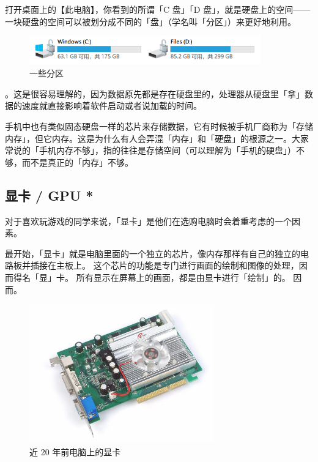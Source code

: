 打开桌面上的【此电脑】，你看到的所谓「C 盘」「D 盘」，就是硬盘上的空间——一块硬盘的空间可以被划分成不同的「盘」（学名叫「分区」）来更好地利用。

\begin{figure}[H]
  \centering
  \includegraphics[width=10cm]{assets/Partition.png}
  \caption{一些分区}
  \label{partitions}
\end{figure}


。这是很容易理解的，因为数据原先都是存在硬盘里的，处理器从硬盘里「拿」数据的速度就直接影响着软件启动或者说加载的时间。

\begin{note}
  手机中也有类似固态硬盘一样的芯片来存储数据，它有时候被手机厂商称为「存储内存」，但它内存。这是为什么有人会弄混「内存」和「硬盘」的根源之一。大家常说的「手机内存不够」，指的往往是存储空间（可以理解为「手机的硬盘」）不够，而不是真正的「内存」不够。
\end{note}

\subsection{显卡 / GPU *}

对于喜欢玩游戏的同学来说，「显卡」是他们在选购电脑时会着重考虑的一个因素。

最开始，「显卡」就是电脑里面的一个独立的芯片，像内存那样有自己的独立的电路板并插接在主板上。
这个芯片的功能是专门进行画面的绘制和图像的处理，因而得名「显」卡。
所有显示在屏幕上的画面，都是由显卡进行「绘制」的。
因而。

\begin{figure}[H]
  \centering
  \includegraphics[width=8cm]{assets/Old_GPU.jpg}
  \caption{近 20 年前电脑上的显卡}
  \label{old-gpu}
\end{figure}

